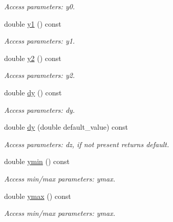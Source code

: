 \begin{DoxyCompactItemize}
\begin{DoxyCompactList}\small\item\em Access parameters: y0. \item\end{DoxyCompactList}\item 
double \hyperlink{struct_d_d4hep_1_1_x_m_l_1_1_child_value_ada9ae76054068818c3711b1d7d0e772f}{y1} () const 
\begin{DoxyCompactList}\small\item\em Access parameters: y1. \item\end{DoxyCompactList}\item 
double \hyperlink{struct_d_d4hep_1_1_x_m_l_1_1_child_value_a2d090567352d8987d4c4f5ac8f468c3b}{y2} () const 
\begin{DoxyCompactList}\small\item\em Access parameters: y2. \item\end{DoxyCompactList}\item 
double \hyperlink{struct_d_d4hep_1_1_x_m_l_1_1_child_value_aabb81a51df0e722851ac0d738f73de4c}{dy} () const 
\begin{DoxyCompactList}\small\item\em Access parameters: dy. \item\end{DoxyCompactList}\item 
double \hyperlink{struct_d_d4hep_1_1_x_m_l_1_1_child_value_a746a8520336d657ea0f42e0e4e1f14a6}{dy} (double default\_\-value) const 
\begin{DoxyCompactList}\small\item\em Access parameters: dz, if not present returns default. \item\end{DoxyCompactList}\item 
double \hyperlink{struct_d_d4hep_1_1_x_m_l_1_1_child_value_aa9ae9ece68a27b9f5b8388eb9917a800}{ymin} () const 
\begin{DoxyCompactList}\small\item\em Access min/max parameters: ymax. \item\end{DoxyCompactList}\item 
double \hyperlink{struct_d_d4hep_1_1_x_m_l_1_1_child_value_aa9eb71920308de7244f59772a2d3c8f4}{ymax} () const 
\begin{DoxyCompactList}\small\item\em Access min/max parameters: ymax. \item\end{DoxyCompactList}\item 

\end{DoxyCompactItemize}
